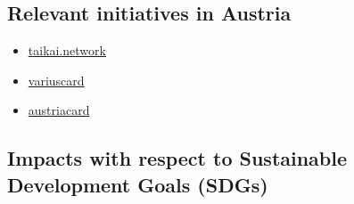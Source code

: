 \documentclass[
]{book}
\providecommand{\tightlist}{%
  \setlength{\itemsep}{0pt}\setlength{\parskip}{0pt}}
\begin{document}
\hypertarget{relevant-initiatives-in-austria-7}{%
\subsection*{Relevant initiatives in Austria}\label{relevant-initiatives-in-austria-7}}

\begin{itemize}
\tightlist
\item
  \href{https://taikai.network/en/wiener-linien/challenges/tickethon}{taikai.network}
\item
  \href{https://www.variuscard.com/}{variuscard}
\item
  \href{https://www.austriacard.com/}{austriacard}
\end{itemize}

\hypertarget{impacts-with-respect-to-sustainable-development-goals-sdgs-7}{%
\subsection*{Impacts with respect to Sustainable Development Goals (SDGs)}\label{impacts-with-respect-to-sustainable-development-goals-sdgs-7}}
\end{document}
